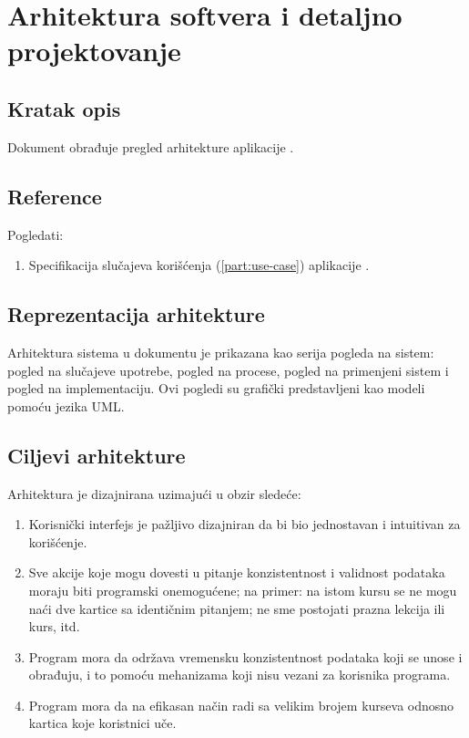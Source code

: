 \part{Arhitektura softvera i detaljno projektovanje}

\chapter{Kratak opis}
Dokument obrađuje pregled arhitekture aplikacije \UpamtiOnline.

\chapter{Reference}
Pogledati:
\begin{enumerate}
  \item Specifikacija slučajeva korišćenja (\ref{part:use-case}) aplikacije \UpamtiOnline.
\end{enumerate}

\chapter{Reprezentacija arhitekture}
Arhitektura sistema u dokumentu je prikazana kao serija pogleda na sistem:
pogled na slučajeve upotrebe, pogled na procese, pogled na primenjeni sistem i pogled na implementaciju.
Ovi pogledi su grafički predstavljeni kao modeli pomoću jezika UML.

\chapter{Ciljevi arhitekture}

Arhitektura je dizajnirana uzimajući u obzir sledeće:
\begin{enumerate}
  \item Korisnički interfejs je pažljivo dizajniran da bi bio jednostavan i intuitivan za korišćenje.
  \item Sve akcije koje mogu dovesti u pitanje konzistentnost i validnost podataka moraju biti programski onemogućene; na primer: na istom kursu se ne mogu naći dve kartice sa identičnim pitanjem; ne sme postojati prazna lekcija ili kurs, itd.
  \item Program mora da održava vremensku konzistentnost podataka koji se unose i obrađuju, i to pomoću mehanizama koji nisu vezani za korisnika programa.
  \item Program mora da na efikasan način radi sa velikim brojem kurseva odnosno kartica koje koristnici uče.
\end{enumerate}

